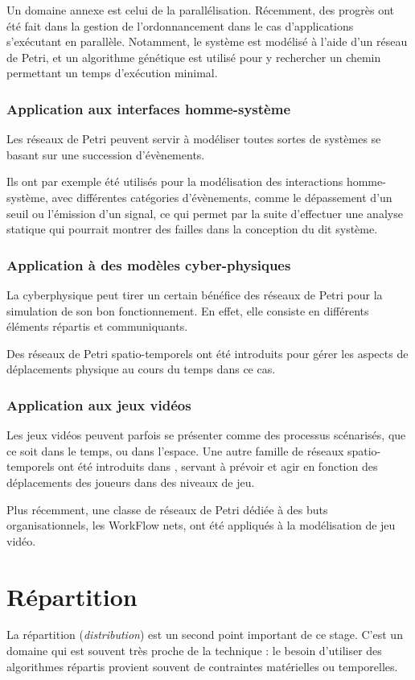Un domaine annexe est celui de la parallélisation. Récemment, des progrès ont été fait dans la gestion de l'ordonnancement dans le cas d'applications s'exécutant en parallèle\cite{chen2014research}. Notamment, le système est modélisé à l'aide d'un réseau de Petri, et un algorithme génétique est utilisé pour y rechercher un chemin permettant un temps d'exécution minimal. 

\subsubsection{Application aux interfaces homme-système}
Les réseaux de Petri peuvent servir à modéliser toutes sortes de systèmes se basant sur une succession d'évènements.
 
Ils ont par exemple été utilisés pour la modélisation des interactions homme-système\cite{campos2014elementary}, avec différentes catégories d'évènements, comme le dépassement d'un seuil ou l'émission d'un signal, ce qui permet par la suite d'effectuer une analyse statique qui pourrait montrer des failles dans la conception du dit système.

\subsubsection{Application à des modèles cyber-physiques}
La \gls{cyberphysique} peut tirer un certain bénéfice des réseaux de Petri pour la simulation de son bon fonctionnement. En effet, elle consiste en différents éléments répartis et communiquants.

Des réseaux de Petri spatio-temporels ont été introduits\cite{zhang2014modeling} pour gérer les aspects de déplacements physique au cours du temps dans ce cas.

\subsubsection{Application aux jeux vidéos}
Les jeux vidéos peuvent parfois se présenter comme des processus scénarisés, que ce soit dans le temps, ou dans l'espace.
Une autre famille de réseaux spatio-temporels ont été introduits dans \cite{natkin2004new}, servant à prévoir et agir en fonction des déplacements des joueurs dans des niveaux de jeu.

Plus récemment, une classe de réseaux de Petri dédiée à des buts organisationnels, les WorkFlow nets\cite{oliveira2011game}, ont été appliqués à la modélisation de jeu vidéo.
\section{Répartition}
La répartition (\textit{distribution}) est un second point important de ce stage. C'est un domaine qui est souvent très proche de la technique : le besoin d'utiliser des algorithmes répartis provient souvent de contraintes matérielles ou temporelles.


